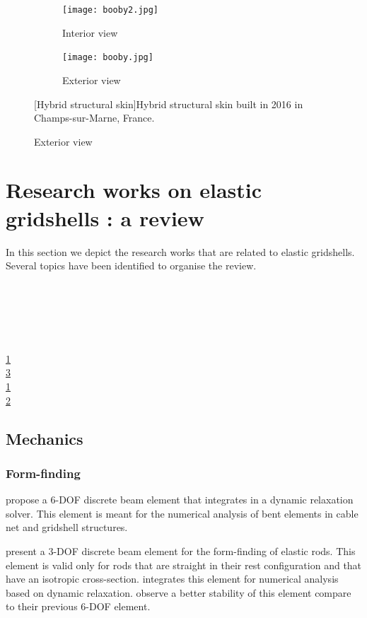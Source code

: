 \begin{figure}[t]
	\begin{subfigure}[b]{\TwoMediaWidth}
		\texttt{[image: booby2.jpg]}
		\caption{Interior view}
		\label{fa}
	\end{subfigure}%
	\hspace{\MediaGutterWidth}%
	\begin{subfigure}[b]{\TwoMediaWidth}
		\texttt{[image: booby.jpg]}
		\caption{Exterior view}
		\label{fb}
	\end{subfigure}
	[Hybrid structural skin]{Hybrid structural skin built in 2016 in Champs-sur-Marne, France.}
	\label{f}
\end{figure}


\section{Research works on elastic gridshells : a review}
\label{sec=review_research}
In this section we depict the research works that are related to elastic gridshells. Several topics have been identified to organise the review.

\\
\\
\\
\\
\\
\cref{sec=review_research}\\
\cref{f}\\
\cref{fa}\\
\cref{fb}\\

\subsection{Mechanics}

\subsubsection{Form-finding}

 propose a 6-DOF discrete beam element that integrates in a dynamic relaxation solver. This element is meant for the numerical analysis of bent elements in cable net and gridshell structures.

 present a 3-DOF discrete beam element for the form-finding of elastic rods. This element is valid only for rods that are straight in their rest configuration and that have an isotropic cross-section.  integrates this element for numerical analysis based on dynamic relaxation.  observe a better stability of this element compare to their previous 6-DOF element.

